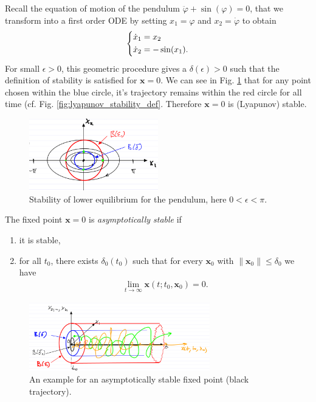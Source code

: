 \begin{ex}
	Recall the equation of motion of the pendulum $\ddot{\varphi} + \sin(\varphi) = 0$, that we transform into a first order ODE by setting $x_1 = \varphi$ and $x_2 = \dot{\varphi}$ to obtain
	\begin{align}
		\begin{dcases}
		\dot{x}_1 = x_2 \\
	\dot{x}_2 = -\sin(x_1).
		\end{dcases}
	\end{align}
	For small $\epsilon>0$, this geometric procedure gives a $\delta(\epsilon)>0$ such that the definition of stability is satisfied for $ \bm{x}=0$. We can see in Fig. \ref{fig:pend_lower_stability}  that for any point chosen within the blue circle, it's trajectory remains within the red circle for all time (cf. Fig. \ref{fig:lyapunov_stability_def}. Therefore $ \bm{x}=0$ is (Lyapunov) stable.
	\begin{figure}[h!]
		\centering
		\includegraphics[width=0.5\textwidth]{figures/ch2/2pendulum_stability.png}
		\caption{Stability of lower equilibrium for the pendulum, here $0<\epsilon<\pi $.}
	\label{fig:pend_lower_stability}
	\end{figure}
\end{ex}

\begin{definition}
	The fixed point $ \bm{x}=0$ is \emph{asymptotically stable} if
\begin{enumerate}
	\item it is stable,
	\item for all $t_0$, there exists $\delta_0(t_0)$ such that for every $ \bm{x}_0$ with $\|  \bm{x}_0 \| \leq \delta_0$ we have
		\begin{align}
			\boxed{\lim_{t\to \infty }  \bm{x}(t; t_0,  \bm{x}_0) = 0.}
		\end{align}
\end{enumerate}
\begin{figure}[h!]
	\centering
	\includegraphics[width=0.7\textwidth]{figures/ch2/3asymp_stability.png}
	\caption{An example for an asymptotically stable fixed point (black trajectory).}
\end{figure}
\end{definition}

